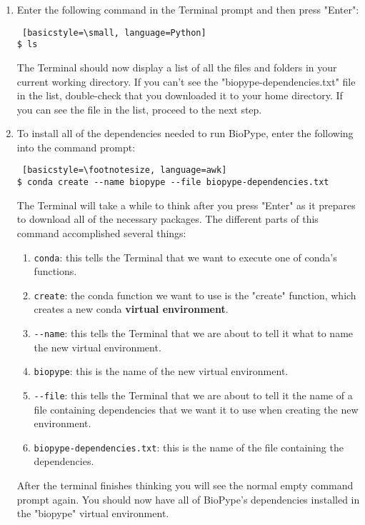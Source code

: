 \begin{enumerate}
\item Enter the following command in the Terminal prompt and then press "Enter":
    \begin{lstlisting} [basicstyle=\small, language=Python]
$ ls
    \end{lstlisting}

The Terminal should now display a list of all the files and folders in your current working directory. If you can't see the "biopype-dependencies.txt" file in the list, double-check that you downloaded it to your home directory. If you can see the file in the list, proceed to the next step.


\item To install all of the dependencies needed to run BioPype, enter the following into the command prompt:
    \begin{lstlisting} [basicstyle=\footnotesize, language=awk]
$ conda create --name biopype --file biopype-dependencies.txt
    \end{lstlisting}
The Terminal will take a while to think after you press "Enter" as it prepares to download all of the necessary packages. The different parts of this command accomplished several things:
    \begin{enumerate}
        \item \verb|conda|: this tells the Terminal that we want to execute one of conda's functions.
        \item \verb|create|: the conda function we want to use is the "create" function, which creates a new conda \textbf{virtual environment}. 
        \item \verb|--name|: this tells the Terminal that we are about to tell it what to name the new virtual environment.
        \item \verb|biopype|: this is the name of the new virtual environment.
        \item \verb|--file|: this tells the Terminal that we are about to tell it the name of a file containing dependencies that we want it to use when creating the new environment.
        \item \verb|biopype-dependencies.txt|: this is the name of the file containing the dependencies.
    \end{enumerate}
    After the terminal finishes thinking you will see the normal empty command prompt again. You should now have all of BioPype's dependencies installed in the "biopype" virtual environment. 


\end{enumerate}


